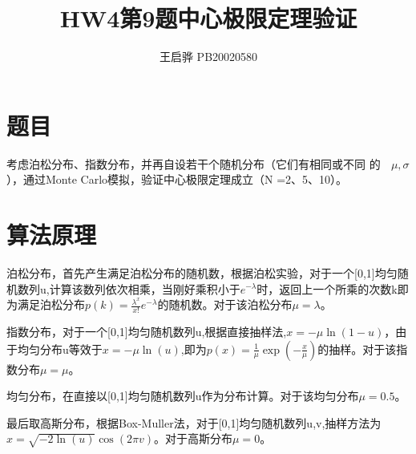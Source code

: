 \documentclass{article}
\title{\songti \zihao{2}\bfseries HW4第9题中心极限定理验证}
\author{王启骅 PB20020580}
\begin{document}
	\maketitle
	\section{题目}
考虑泊松分布、指数分布，并再自设若干个随机分布（它们有相同或不同
的  $ \mu,\sigma $），通过Monte Carlo模拟，验证中心极限定理成立（N =2、5、10）。
	
	\section{算法原理}
泊松分布，首先产生满足泊松分布的随机数，根据泊松实验，对于一个[0,1]均匀随机数列u,计算该数列依次相乘，当刚好乘积小于$ e^{-\lambda} $时，返回上一个所乘的次数k即为满足泊松分布$ p(k)=\frac{\lambda^x}{x!}e^{-\lambda} $的随机数。对于该泊松分布$ \mu=\lambda $。


指数分布，对于一个[0,1]均匀随机数列u,根据直接抽样法,$ x=-\mu\ln(1-u) $，由于均匀分布u等效于$ x=-\mu\ln(u) $,即为$ p(x)=\frac{1}{\mu}\exp(-\frac{x}{\mu}) $的抽样。对于该指数分布$ \mu=\mu $。


均匀分布，在直接以[0,1]均匀随机数列u作为分布计算。对于该均匀分布$ \mu=0.5 $。


最后取高斯分布，根据Box-Muller法，对于[0,1]均匀随机数列u,v,抽样方法为$ x=\sqrt{-2\ln(u)}\cos(2\pi v) $。对于高斯分布$ \mu=0 $。
\end{document}
